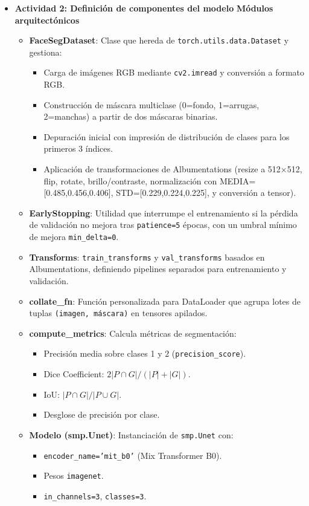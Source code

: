 \begin{enumerate}
\begin{itemize}
  \item\textbf{Actividad 2: Definición de componentes del modelo}
  \textbf{Módulos arquitectónicos}
\begin{itemize}
  \item \textbf{FaceSegDataset}: Clase que hereda de \texttt{torch.utils.data.Dataset} y gestiona:
    \begin{itemize}
      \item Carga de imágenes RGB mediante \texttt{cv2.imread} y conversión a formato RGB.
      \item Construcción de máscara multiclase (0=fondo, 1=arrugas, 2=manchas) a partir de dos máscaras binarias.
      \item Depuración inicial con impresión de distribución de clases para los primeros 3 índices.
      \item Aplicación de transformaciones de Albumentations (resize a 512×512, flip, rotate, brillo/contraste, normalización con MEDIA=[0.485,0.456,0.406], STD=[0.229,0.224,0.225], y conversión a tensor).
    \end{itemize}

  \item \textbf{EarlyStopping}: Utilidad que interrumpe el entrenamiento si la pérdida de validación no mejora tras \texttt{patience=5} épocas, con un umbral mínimo de mejora \texttt{min\_delta=0}.

  \item \textbf{Transforms}:  
    \texttt{train\_transforms} y \texttt{val\_transforms} basados en Albumentations, definiendo pipelines separados para entrenamiento y validación.

  \item \textbf{collate\_fn}: Función personalizada para DataLoader que agrupa lotes de tuplas \texttt{(imagen, máscara)} en tensores apilados.

  \item \textbf{compute\_metrics}: Calcula métricas de segmentación:
    \begin{itemize}
      \item Precisión media sobre clases 1 y 2 (\texttt{precision\_score}).
      \item Dice Coefficient: $2|P\cap G|/(|P|+|G|)$.
      \item IoU: $|P\cap G|/|P\cup G|$.
      \item Desglose de precisión por clase.
    \end{itemize}

  \item \textbf{Modelo (smp.Unet)}:  
    Instanciación de \texttt{smp.Unet} con:
    \begin{itemize}
      \item \texttt{encoder\_name='mit\_b0'} (Mix Transformer B0).
      \item Pesos \texttt{imagenet}.
      \item \texttt{in\_channels=3}, \texttt{classes=3}.
    \end{itemize}
\end{itemize}


\end{itemize}
\end{enumerate}
